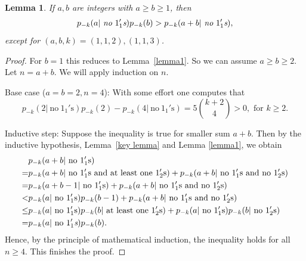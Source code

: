 \documentclass[12pt,reqno]{amsart}
\numberwithin{equation}{section}
\theoremstyle{plain}
\newtheorem{lemma}[theorem]{Lemma}
\theoremstyle{definition}
\begin{document}
\begin{lemma}\label{lemma2}
If $a, b$ are integers with $a\geq b\geq1$, then
\begin{align*}
p_{-k}(a|~\emph{no}~1_{1}'\emph{s})p_{-k}(b) >p_{-k}(a+b|~\emph{no}~1_{1}'\emph{s}),
\end{align*}
except for $(a,b,k)=(1,1,2), (1,1,3)$.
\end{lemma}
\begin{proof}
For $b=1$ this reduces to Lemma~\ref{lemma1}. So we can assume $a\ge b\ge 2$. Let $n=a+b$. We will apply induction on $n$.

Base case ($a=b=2,n=4$): With some effort one computes that $$p_{-k}(2|~\text{no}~1_{1}'\text{s})p_{-k}(2) - p_{-k}(4|~\text{no}~1_{1}'\text{s})=5\binom{k+2}{4}>0, \text{ for }k\ge 2.$$

Inductive step: Suppose the inequality is true for smaller sum $a+b$. Then by the inductive hypothesis, Lemma~\ref{key lemma} and Lemma \ref{lemma1}, we obtain
\begin{align*}
 &p_{-k}(a+b|~\textrm{no}~1_{1}'\textrm{s})\\
  =&p_{-k}(a+b|~\textrm{no}~1_{1}'\textrm{s~and~at~least~one}~1_{2}'\textrm{s})+p_{-k}(a+b|~\textrm{no}~1_{1}'\textrm{s~and~no~}1_{2}'\textrm{s})\\
 =&p_{-k}(a+b-1|~\textrm{no}~1_{1}'\textrm{s})+p_{-k}(a+b|~\textrm{no}~1_{1}'\textrm{s~and~no~}1_{2}'\textrm{s})\\
 <&p_{-k}(a|~\textrm{no}~1_{1}'\textrm{s})p_{-k}(b-1)+p_{-k}(a+b|~\textrm{no}~1_{1}'\textrm{s~and~no~}1_{2}'\textrm{s})\\
 \le &p_{-k}(a|~\textrm{no}~1_{1}'\textrm{s})p_{-k}(b|\textrm{~at~least~one~}1_{2}'\textrm{s})+p_{-k}(a|~\textrm{no}~1_{1}'\textrm{s})p_{-k}(b|~\textrm{no}~1_{2}'\textrm{s})\\
 =&p_{-k}(a|~\textrm{no}~1_{1}'\emph{s})p_{-k}(b).
\end{align*}
Hence, by the principle of mathematical induction, the inequality holds for all $n\geq4$. This finishes the proof.
\end{proof}
\end{document}
